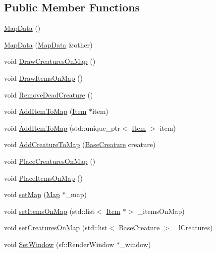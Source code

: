 \subsection*{Public Member Functions}
\begin{DoxyCompactItemize}
\item 
\mbox{\hyperlink{class_map_data_aca1581fc02ec46b4da7ed9b83c04a116}{Map\+Data}} ()
\item 
\mbox{\hyperlink{class_map_data_a4f905b12cec13eb4c1c3caaa88998898}{Map\+Data}} (\mbox{\hyperlink{class_map_data}{Map\+Data}} \&other)
\item 
void \mbox{\hyperlink{class_map_data_ad7ff044e19425487082134fe86221d07}{Draw\+Creatures\+On\+Map}} ()
\item 
void \mbox{\hyperlink{class_map_data_abfdefc2bef87a02d3d83176ad6ba7832}{Draw\+Items\+On\+Map}} ()
\item 
void \mbox{\hyperlink{class_map_data_a737946a4648a34f99452a6bff1b727f6}{Remove\+Dead\+Creature}} ()
\item 
void \mbox{\hyperlink{class_map_data_a134c2de11f90b487d30fdae6570bc256}{Add\+Item\+To\+Map}} (\mbox{\hyperlink{class_item}{Item}} $\ast$item)
\item 
void \mbox{\hyperlink{class_map_data_a27d20220e1bd6db934312f30a15dbcb0}{Add\+Item\+To\+Map}} (std\+::unique\+\_\+ptr$<$ \mbox{\hyperlink{class_item}{Item}} $>$ item)
\item 
void \mbox{\hyperlink{class_map_data_ab54fe2f14d5192d3e1683a6c48839f80}{Add\+Creature\+To\+Map}} (\mbox{\hyperlink{class_base_creature}{Base\+Creature}} creature)
\item 
void \mbox{\hyperlink{class_map_data_ad377a46f779bfcb9ac57dcdd3a969eca}{Place\+Creatures\+On\+Map}} ()
\item 
void \mbox{\hyperlink{class_map_data_aae575fa856f1d179220c4781873fd635}{Place\+Items\+On\+Map}} ()
\item 
void \mbox{\hyperlink{class_map_data_a8adfe57c9e74b6e306540dcb003feb95}{set\+Map}} (\mbox{\hyperlink{class_map}{Map}} $\ast$\+\_\+map)
\item 
void \mbox{\hyperlink{class_map_data_a44e4f889a01270765db90de0ebb62aa5}{set\+Items\+On\+Map}} (std\+::list$<$ \mbox{\hyperlink{class_item}{Item}} $\ast$$>$ \+\_\+items\+On\+Map)
\item 
void \mbox{\hyperlink{class_map_data_ad62fed28a640928527502b00b291aabd}{set\+Creatures\+On\+Map}} (std\+::list$<$ \mbox{\hyperlink{class_base_creature}{Base\+Creature}} $>$ \+\_\+l\+Creatures)
\item 
void \mbox{\hyperlink{class_map_data_a2c65f950748fe264276e292f8a5b92f5}{Set\+Window}} (sf\+::\+Render\+Window $\ast$\+\_\+window)
\end{DoxyCompactItemize}
